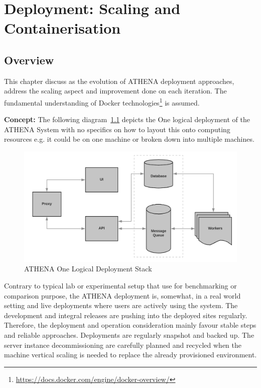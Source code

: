 \chapter{Deployment: Scaling and Containerisation}

\label{Chapter3}

\section{Overview}
This chapter discuss as the evolution of ATHENA deployment approaches, address the scaling aspect and improvement done on each iteration. The fundamental understanding of Docker technologies\footnote{\url{https://docs.docker.com/engine/docker-overview/}} is assumed.

\noindent \textbf{Concept:} \quad The following diagram~\ref{fig:deployStack} depicts the One logical deployment of the ATHENA System with no specifics on how to layout this onto computing resources e.g. it could be on one machine or broken down into multiple machines.

\begin{figure}[H]
\centering
\includegraphics[width=0.5\paperwidth]{Figures/ATHENA_deploy_stack}
\decoRule
\caption[ATHENA Deployment Stack]{ATHENA One Logical Deployment Stack}
\label{fig:deployStack}
\end{figure}

Contrary to typical lab or experimental setup that use for benchmarking or comparison purpose, the ATHENA deployment is, somewhat, in a real world setting and live deployments where users are actively using the system. The development and integral releases are pushing into the deployed sites regularly. Therefore, the deployment and operation consideration mainly favour stable steps and reliable approaches. Deployments are regularly snapshot and backed up. The server instance decommissioning are carefully planned and recycled when the machine vertical scaling is needed to replace the already provisioned environment. 

